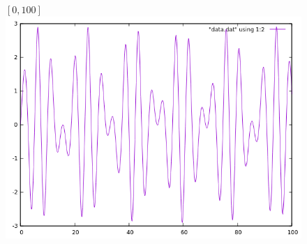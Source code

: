 \documentclass[12pt, a4paper] {article}
\theoremstyle{remark}
\theoremstyle{definition}
\begin{document}
\newpage
\begin{figure}[h!]
$[0, 100]$ \\
\centering
\includegraphics[width=1\linewidth]{sovle_plus_100.png} 
\flushleft
\end{figure}
\end{document}
